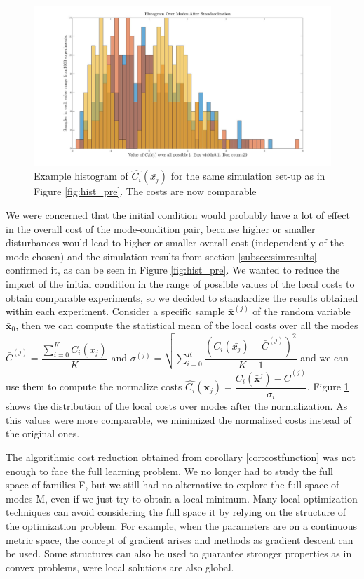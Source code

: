 \documentclass[12,twoside]{TFG-GM}
\theoremstyle{definition}
\theoremstyle{remark}
\newcommand*\mean[1]{\bar{#1}}
\newcommand*\diff[1]{\bar{#1}}
\begin{document}
\begin{figure}[htb!]
\begin{center}
\includegraphics[width=16cm]{hist_after_std.jpg}
\caption{\label{fig:hist_post} \small Example histogram of $\hat{C_i}(\diff{x_j})$ for the same simulation set-up as in Figure \ref{fig:hist_pre}. The costs are now comparable}
\end{center}
\end{figure}

We were concerned that the initial condition would probably have a lot of effect in the overall cost of the mode-condition pair, because higher or smaller disturbances would lead to higher or smaller overall cost (independently of the mode chosen) and the simulation results from section \ref{subsec:simresults} confirmed it, as can be seen in Figure \ref{fig:hist_pre}. We wanted to reduce the impact of the initial condition in the range of possible values of the local costs to obtain comparable experiments, so we decided to standardize the results obtained within each experiment. Consider a specific sample $\diff{\textbf{x}}^{(j)}$ of the random variable $\diff{\textbf{x}}_0$, then we can compute the statistical mean of the local costs over all the modes $\mean{C}^{(j)} = \dfrac{\sum\limits_{i = 0}^{K}{C_i(\diff{x_j})}}{K}$ and $\sigma^{(j)} = \sqrt{\sum\limits_{i=0}^{K}{\dfrac{(C_i(\diff{x_j}) - \diff{C}^{(j)})^2} {K - 1}}}$ and we can use them to compute the normalize costs $\hat{C_i}(\diff{\textbf{x}}_j) = \dfrac{C_i(\diff{\textbf{x}}^{j}) - \diff{C}^{(j)}}{\sigma_i}$. Figure \ref{fig:hist_post} shows the distribution of the local costs over modes after the normalization. As this values were more comparable, we minimized the normalized costs instead of the original ones.

The algorithmic cost reduction obtained from corollary \ref{cor:costfunction} was not enough to face the full learning problem. We no longer had to study the full space of families F, but we still had no alternative to explore the full space of modes M, even if we just try to obtain a local minimum. Many local optimization techniques can avoid considering the full space it by relying on the structure of the optimization problem. For example, when the parameters are on a continuous metric space, the concept of gradient arises and methods as gradient descent can be used. Some structures can also be used to guarantee stronger properties as in convex problems, were local solutions are also global.
\end{document}

